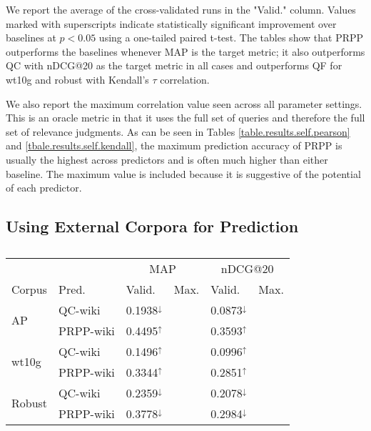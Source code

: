 \documentclass{sig-alternate}
\begin{document}
We report the average of the cross-validated runs in the "Valid." column. Values marked with superscripts indicate statistically significant improvement over baselines at $p < 0.05$ using a one-tailed paired t-test. The tables show that PRPP outperforms the baselines whenever MAP is the target metric; it also outperforms QC with nDCG@20 as the target metric in all cases and outperforms QF for wt10g and robust with Kendall's $\tau$ correlation.

We also report the maximum correlation value seen across all parameter settings. This is an oracle metric in that it uses the full set of queries and therefore the full set of relevance judgments. As can be seen in Tables \ref{table.results.self.pearson} and \ref{tbale.results.self.kendall}, the maximum prediction accuracy of PRPP is usually the highest across predictors and is often much higher than either baseline. The maximum value is included because it is suggestive of the potential of each predictor.

\subsection{Using External Corpora for Prediction}\label{section.results.external}

\begin{table}
\begin{tabular}{|l|l|l|l|l|l|} \hline
& & \multicolumn{2}{c|}{MAP} & \multicolumn{2}{c|}{nDCG@20} \\ \cline{3-6}
Corpus & Pred. & Valid. & Max. & Valid. & Max. \\ \hline\hline
\multirow{2}{*}{AP} & QC-wiki & 0.1938$^{\downarrow}$ & & 0.0873$^{\downarrow}$ & \\ \cline{2-6}
& PRPP-wiki & 0.4495$^{\uparrow}$ & & 0.3593$^{\uparrow}$ & \\ \hline\hline
\multirow{2}{*}{wt10g} & QC-wiki & 0.1496$^{\uparrow}$ & & 0.0996$^{\uparrow}$ & \\ \cline{2-6}
& PRPP-wiki & 0.3344$^{\uparrow}$ & & 0.2851$^{\uparrow}$ & \\ \hline\hline
\multirow{2}{*}{Robust} & QC-wiki & 0.2359$^{\downarrow}$ & & 0.2078$^{\downarrow}$ & \\ \cline{2-6}
& PRPP-wiki & 0.3778$^{\downarrow}$ & & 0.2984$^{\downarrow}$ & \\ \hline
\end{tabular}
\caption{}
\label{table.results.wiki.pearson}
\end{table}
\end{document}
